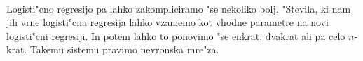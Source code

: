 \paragraph{}
Logisti"cno regresijo pa lahko zakompliciramo "se nekoliko bolj. "Stevila, ki nam jih vrne logisti"cna regresija lahko vzamemo kot vhodne parametre na novi logisti"cni regresiji. In potem lahko to ponovimo "se enkrat, dvakrat ali pa celo $n$-krat. Takemu sistemu pravimo nevronska mre"za. 
